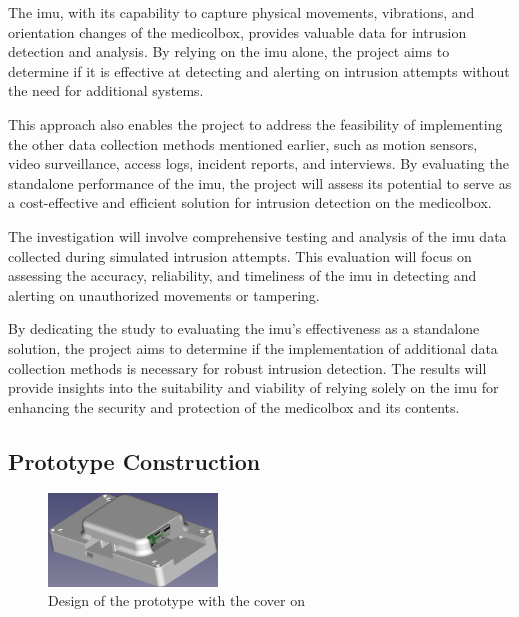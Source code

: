 \documentclass[../main.tex]{subfiles}
\begin{document}
    The \gls{imu}, with its capability to capture physical movements,
    vibrations, and orientation changes of the \gls{medicolbox},
    provides valuable data for \gls{intrusion} detection and analysis.
    By relying on the \gls{imu} alone, the project aims to determine if
    it is effective at detecting and alerting on \gls{intrusion} attempts without the
    need for additional systems.

    This approach also enables the project to address the feasibility of
    implementing the other data collection methods mentioned earlier,
    such as motion sensors, video surveillance, access logs,
    incident reports, and interviews.
    By evaluating the standalone performance of the \gls{imu},
    the project will assess its potential to serve as a cost-effective and
    efficient solution for \gls{intrusion} detection on the \gls{medicolbox}.

    The investigation will involve comprehensive testing and analysis of the
    \gls{imu} data collected during simulated \gls{intrusion} attempts.
    This evaluation will focus on assessing the accuracy, reliability,
    and timeliness of the \gls{imu} in detecting and
    alerting on unauthorized movements or tampering.

    By dedicating the study to evaluating the
    \gls{imu}'s effectiveness as a standalone solution,
    the project aims to determine if the implementation of
    additional data collection methods is
    necessary for robust \gls{intrusion} detection.
    The results will provide insights into the suitability and
    viability of relying solely on the \gls{imu} for enhancing the
    security and protection of the \gls{medicolbox} and its contents.

    \clearpage

    \subsection{Prototype Construction}
    \begin{figure}[htbp]
        \centering
        \includegraphics[width=0.4\textwidth]{resources/images/rpi_with_cover.png}
        \caption{Design of the prototype with the cover on}
        \label{fig:prototype_graphics_with_cover}
    \end{figure}
\end{document}
